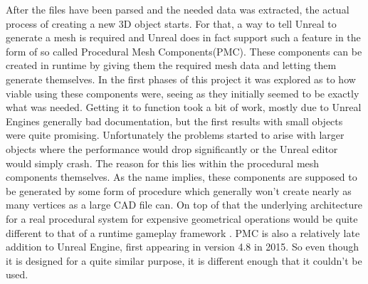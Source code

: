 After the files have been parsed and the needed data was extracted, the actual process of creating a new 3D object starts. For that, a way to tell Unreal to generate a mesh is required and Unreal does in fact support such a feature in the form of so called Procedural Mesh Components(PMC). These components can be created in runtime by giving them the required mesh data and letting them generate themselves. In the first phases of this project it was explored as to how viable using these components were, seeing as they initially seemed to be exactly what was needed. Getting it to function took a bit of work, mostly due to Unreal Engines generally bad documentation, but the first results with small objects were quite promising. Unfortunately the problems started to arise with larger objects where the performance would drop significantly or the Unreal editor would simply crash. The reason for this lies within the procedural mesh components themselves. As the name implies, these components are supposed to be generated by some form of procedure which generally won't create nearly as many vertices as a large CAD file can. On top of that the underlying architecture for a real procedural system for expensive geometrical operations would be quite different to that of a runtime gameplay framework \cite{}. PMC is also a relatively late addition to Unreal Engine, first appearing in version 4.8 in 2015. So even though it is designed for a quite similar purpose, it is different enough that it couldn't be used.\\

